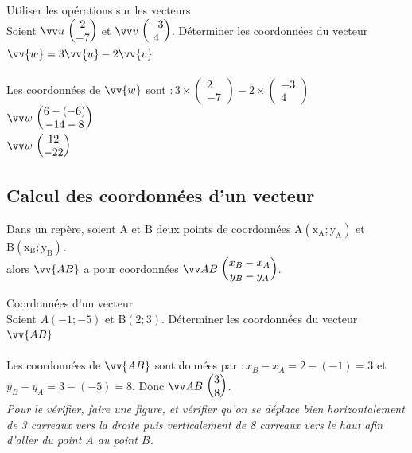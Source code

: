 \documentclass[11pt,a4paper]{article}  %
\begin{document}
\begin{bmethodet}{Utiliser les opérations sur les vecteurs}
	\\
	Soient $\Coord{u}{2}{-7}$ et $\Coord{v}{-3}{4}$. Déterminer les coordonnées du vecteur $\vv{w}=3 \vv{u}-2 \vv{v}$\\
	\\
	Les coordonnées de $\vv{w}$ sont $: 3 \times\left(\begin{array}{c}2 \\ -7\end{array}\right)-2 \times\left(\begin{array}{c}-3 \\ 4\end{array}\right)$\\
	$\Coord{w}{6-(-6)}{-14-8}$\\
	$\Coord{w}{12}{-22}$
\end{bmethodet}

\subsection{Calcul des coordonnées d'un vecteur}

\begin{bprop}
	Dans un repère, soient $\mathrm{A}$ et $\mathrm{B}$ deux points de coordonnées $\mathrm{A}\left(\mathrm{x}_{\mathrm{A}} ; \mathrm{y}_{\mathrm{A}}\right)$ et $\mathrm{B}\left(\mathrm{x}_{\mathrm{B}} ; \mathrm{y}_{\mathrm{B}}\right)$.\\
	alors $\vv{A B}$ a pour coordonnées $\Coord{AB}{x_B-x_A}{y_B-y_A}$.
\end{bprop}

\begin{bmethodet}{Coordonnées d'un vecteur}
	\\
	Soient $A(-1 ;-5) \text { et } \mathrm{B}(2 ; 3)$. Déterminer les coordonnées du vecteur $\vv{A B}$\\
	\\
	Les coordonnées de $\vv{A B}$ sont données par $: x_{B}-x_{A}=2-(-1)=3$ et $y_{B}-y_{A}=3-(-5)=8$. Donc $\Coord{AB}{3}{8}$.\\
	\emph{Pour le vérifier, faire une figure, et vérifier qu'on se déplace bien horizontalement de 3 carreaux vers la droite puis verticalement de 8 carreaux vers le haut afin d'aller du point A au point $B$.}
\end{bmethodet}

\end{document}
